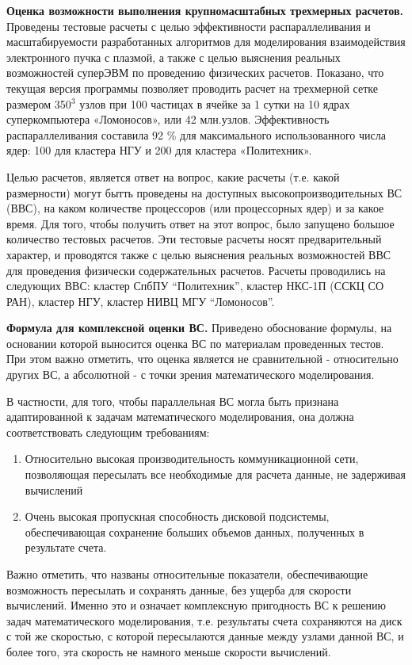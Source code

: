 \textbf{Оценка возможности выполнения крупномасштабных трехмерных расчетов.}
Проведены тестовые расчеты с целью эффективности распараллеливания и масштабируемости разработанных алгоритмов для моделирования взаимодействия электронного пучка с плазмой, а также с целью выяснения реальных возможностей суперЭВМ по проведению физических расчетов. Показано, что текущая версия программы позволяет проводить расчет на трехмерной сетке размером 350$^3$ узлов при 100 частицах в ячейке за 1 сутки на 10 ядрах суперкомпьютера «Ломоносов», или 42 млн.узлов. Эффективность распараллеливания составила 92 \% для максимального использованного числа ядер: 100 для кластера НГУ и 200 для кластера «Политехник».  

Целью расчетов,  является ответ на вопрос, какие расчеты (т.е. какой размерности) могут бытть проведены на доступных высокопроизводительных  ВС (ВВС), на каком количестве процессоров (или процессорных ядер) и за какое время. 
Для того, чтобы получить ответ на этот вопрос, было запущено большое количество тестовых расчетов. Эти тестовые расчеты носят предварительный характер, и проводятся также с целью выяснения реальных возможностей ВВС для проведения физически содержательных расчетов. 	Расчеты проводились на следующих ВВС: кластер СпбПУ “Политехник”, кластер НКС-1П (ССКЦ СО РАН), кластер НГУ,  кластер НИВЦ МГУ “Ломоносов”. 

\textbf{Формула для комплексной оценки ВС.}
Приведено обоснование формулы, на основании которой выносится оценка ВС по материалам проведенных тестов. При этом важно отметить, что оценка является не сравнительной - относительно других ВС, а абсолютной - с точки зрения математического моделирования. 

В частности, для того, чтобы параллельная ВС могла быть признана адаптированной к задачам математического моделирования, она должна соответствовать следующим требованиям:
\begin{enumerate}
	\item Относительно высокая производительность коммуникационной сети, позволяющая пересылать все необходимые для расчета данные, не задерживая вычислений
	\item Очень высокая пропускная способность дисковой подсистемы, обеспечивающая сохранение больших объемов данных, полученных в результате счета.  	
\end{enumerate}

Важно отметить, что названы относительные показатели, обеспечивающие возможность пересылать и сохранять данные, без ущерба для скорости вычислений. Именно это и означает  комплексную пригодность ВС к решению задач математического моделирования, т.е. результаты счета сохраняются на диск с той же скоростью, с которой пересылаются данные между узлами данной ВС, и более того, эта скорость не намного меньше скорости вычислений.

